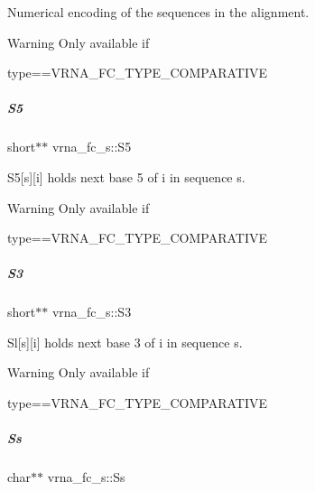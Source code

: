 Numerical encoding of the sequences in the alignment. 

\begin{DoxyWarning}{Warning}
Only available if\begin{DoxyVerb}type==VRNA_FC_TYPE_COMPARATIVE \end{DoxyVerb}
 
\end{DoxyWarning}
\mbox{\label{group__fold__compound_a78d089b475e2230bd536b9a6ed8bb17c}} 
\subparagraph{\texorpdfstring{S5}{S5}}
{\footnotesize\ttfamily short$\ast$$\ast$ vrna\+\_\+fc\+\_\+s\+::\+S5}



S5\mbox{[}s\mbox{]}\mbox{[}i\mbox{]} holds next base 5\textquotesingle{} of i in sequence s. 

\begin{DoxyWarning}{Warning}
Only available if\begin{DoxyVerb}type==VRNA_FC_TYPE_COMPARATIVE \end{DoxyVerb}
 
\end{DoxyWarning}
\mbox{\label{group__fold__compound_af6ab2a25b84d2308ee23f6b11b5fd52d}} 
\subparagraph{\texorpdfstring{S3}{S3}}
{\footnotesize\ttfamily short$\ast$$\ast$ vrna\+\_\+fc\+\_\+s\+::\+S3}



Sl\mbox{[}s\mbox{]}\mbox{[}i\mbox{]} holds next base 3\textquotesingle{} of i in sequence s. 

\begin{DoxyWarning}{Warning}
Only available if\begin{DoxyVerb}type==VRNA_FC_TYPE_COMPARATIVE \end{DoxyVerb}
 
\end{DoxyWarning}
\mbox{\label{group__fold__compound_abf4a526147da57db63990892987fea29}} 
\subparagraph{\texorpdfstring{Ss}{Ss}}
{\footnotesize\ttfamily char$\ast$$\ast$ vrna\+\_\+fc\+\_\+s\+::\+Ss}

